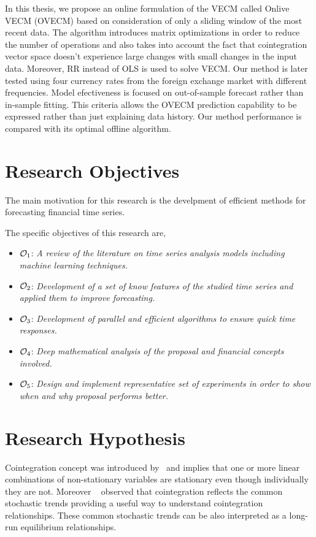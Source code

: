 In this thesis, we propose an online formulation of the VECM called Onlive VECM
(OVECM) based on consideration of only a sliding window of the most recent data.
The algorithm introduces matrix optimizations in order to reduce the number of
operations and also takes into account the fact that cointegration vector space
doesn't experience large changes with small changes in the input data. Moreover,
RR instead of OLS is used to solve VECM. Our method is later tested using four
currency rates from the foreign exchange market with different frequencies.  Model
efectiveness is focused on out-of-sample forecast rather than in-sample fitting.
This criteria allows the OVECM prediction capability to be expressed rather than
just explaining data history. Our method performance is compared with its
optimal offline algorithm.


\section{Research Objectives}
The main motivation for this research is the develpment of efficient methods for
forecasting financial time series.

The specific objectives of this research are,
\begin{itemize}
\item $\Large \mathcal{O}_1$: \emph{A review of the literature on time series
analysis models including machine learning techniques.}
\item $\Large \mathcal{O}_2$: \emph{Development of a set of know features of the
studied time series and applied them to improve forecasting.}
\item $\Large \mathcal{O}_3$: \emph{Development of parallel and efficient
algorithms to ensure quick time responses.}
\item $\Large \mathcal{O}_4$: \emph{Deep mathematical analysis of the proposal
and financial concepts involved.}
\item $\Large \mathcal{O}_5$: \emph{Design and implement representative set of
experiments in order to show when and why proposal performs better.}
\end{itemize}


\section{Research Hypothesis}


Cointegration concept was introduced by~\cite{engle1987} and implies that one or
more linear combinations of non-stationary variables are stationary even though
individually they are not.  Moreover ~\cite{stock+watson1988} observed that
cointegration reflects the common stochastic trends providing a useful way to
understand cointegration relationships. These common stochastic trends can be
also interpreted as a long-run equilibrium relationships.

